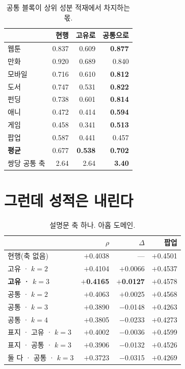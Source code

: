 \documentclass[10pt]{article}
\begin{document}
\begin{table}[t]
\centering\tsize
\caption{공통 블록이 상위 성분 적재에서 차지하는 몫.}
\begin{tabular}{lrrr}
\toprule
& 현행 & 고유로 & \textbf{공통으로} \\
\midrule
웹툰 & 0.837 & 0.609 & \textbf{0.877} \\
만화 & 0.920 & 0.689 & 0.840 \\
모바일 & 0.716 & 0.610 & \textbf{0.812} \\
도서 & 0.747 & 0.531 & \textbf{0.822} \\
펀딩 & 0.738 & 0.601 & \textbf{0.814} \\
애니 & 0.472 & 0.414 & \textbf{0.594} \\
게임 & 0.458 & 0.341 & \textbf{0.513} \\
팝업 & 0.587 & 0.441 & 0.457 \\
\midrule
\textbf{평균} & 0.677 & \textbf{0.538} & \textbf{0.702} \\
\midrule
쌍당 공통 축 & 2.64 & 2.64 & \textbf{3.40} \\
\bottomrule
\end{tabular}
\end{table}


\section{그런데 성적은 내린다}

\begin{table}[t]
\centering\tsize
\caption{설명문 축 하나. 아홉 도메인.}
\begin{tabular}{lrrr}
\toprule
& $\rho$ & $\Delta$ & 팝업 \\
\midrule
현행(축 없음) & $+$0.4038 & --- & $+$0.4501 \\
고유 · $k{=}2$ & $+$0.4104 & $+$0.0066 & $+$0.4537 \\
\textbf{고유 · $k{=}3$} & \textbf{$+$0.4165} & \textbf{$+$0.0127} & $+$0.4578 \\
공통 · $k{=}2$ & $+$0.4063 & $+$0.0025 & $+$0.4568 \\
공통 · $k{=}3$ & $+$0.3890 & $-$0.0148 & $+$0.4263 \\
공통 · $k{=}4$ & $+$0.3805 & $-$0.0233 & $+$0.4273 \\
\midrule
표지 · 고유 · $k{=}3$ & $+$0.4002 & $-$0.0036 & $+$0.4599 \\
표지 · 공통 · $k{=}3$ & $+$0.3906 & $-$0.0132 & $+$0.4526 \\
둘 다 · 공통 · $k{=}3$ & $+$0.3723 & $-$0.0315 & $+$0.4269 \\
\bottomrule
\end{tabular}
\end{table}
\end{document}
